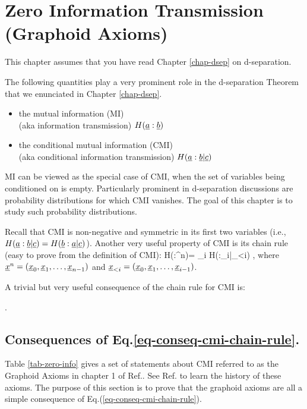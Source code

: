 \chapter{Zero Information Transmission 
(Graphoid Axioms)}

This chapter
assumes that you
have read Chapter \ref{chap-dsep}
on d-separation.


The
following
quantities
play a very prominent
role
in the d-separation Theorem
that we enunciated in Chapter  \ref{chap-dsep}.

\begin{itemize}
\item
the mutual
information (MI)\\
 (aka information transmission) $H({\underline{a}}:{\underline{b}})$
\item
the conditional mutual
information (CMI)\\
(aka conditional
information
transmission) $H({\underline{a}}:{\underline{b}}|{\underline{c}})$
\end{itemize}
MI can be viewed
as the special 
case of CMI,
when the set 
of variables being
conditioned on is empty.
Particularly prominent
in d-separation discussions
are probability
distributions
for which CMI vanishes.
The goal
of this chapter
is to study such 
probability distributions.


Recall that CMI
is non-negative and symmetric
in its first two variables (i.e.,
$H({\underline{a}}:{\underline{b}}|{\underline{c}})=H({\underline{b}}:{\underline{a}}|{\underline{c}})$).
Another very useful
property of CMI
is its chain rule
(easy to prove from the definition of CMI):
\beq
H(\rvy:\rvx^n)=
\sum_i
H(\rvy:\rvx_i|\rvx_{<i})
\;,
\eeq
where ${\underline{x}}^n=({\underline{x}}_0, {\underline{x}}_1, \ldots, {\underline{x}}_{n-1})$
and 
${\underline{x}}_{<i}=({\underline{x}}_0, {\underline{x}}_1, \dots, {\underline{x}}_{i-1})$.

A trivial
but
very useful
consequence
of the chain rule
for CMI is:

\beq{}
\;.
\label{eq-conseq-cmi-chain-rule}
\eeq

\section*{Consequences of 
Eq.\ref{eq-conseq-cmi-chain-rule}.}
Table \ref{tab-zero-info} gives
a set 
of statements about CMI
referred to as  the Graphoid Axioms
in
 chapter 1 
of Ref.\cite{pearl-2013book}. See 
Ref.\cite{pearl-2013book}
to learn
the history of these axioms.
The purpose
of this 
section
is to prove
that the graphoid 
axioms
are all
a simple consequence
of Eq.(\ref{eq-conseq-cmi-chain-rule}).



